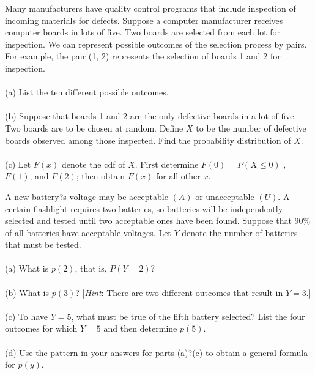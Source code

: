 \documentclass[12pt,letterpaper]{hmcpset}
\begin{document}
\begin{problem}[3.2.15]

Many manufacturers have quality control programs that include
inspection of incoming materials for defects. Suppose
a computer manufacturer receives computer boards in
lots of five. Two boards are selected from each lot for
inspection. We can represent possible outcomes of the selection
process by pairs. For example, the pair (1, 2) represents
the selection of boards 1 and 2 for inspection.\\
\\(a) List the ten different possible outcomes.\\
\\(b) Suppose that boards 1 and 2 are the only defective
boards in a lot of five. Two boards are to be chosen at
random. Define $X$ to be the number of defective boards
observed among those inspected. Find the probability
distribution of $X$.\\
\\(c) Let $F(x)$ denote the cdf of $X$. First determine $F(0) = P(X \leq 0)$
, $F(1)$, and $F(2)$; then obtain $F(x)$ for all other $x$.
\end{problem}

\begin{solution}

\end{solution}
\newpage

\begin{problem}[3.2.17]
A new battery?s voltage may be acceptable $(A)$ or unacceptable
$(U)$. A certain flashlight requires two batteries, so batteries
will be independently selected and tested until two
acceptable ones have been found. Suppose that 90$\%$ of all
batteries have acceptable voltages. Let $Y$ denote the number
of batteries that must be tested.\\
\\(a) What is $p(2)$, that is, $P(Y = 2)$?\\
\\(b) What is $p(3)$? [\textit{Hint}: There are two different outcomes
that result in $Y = 3$.]\\
\\(c) To have $Y = 5$, what must be true of the fifth battery
selected? List the four outcomes for which $Y = 5$ and
then determine $p(5)$.\\
\\(d) Use the pattern in your answers for parts (a)?(c) to obtain
a general formula for $p(y)$.
\end{problem}
\end{document}
